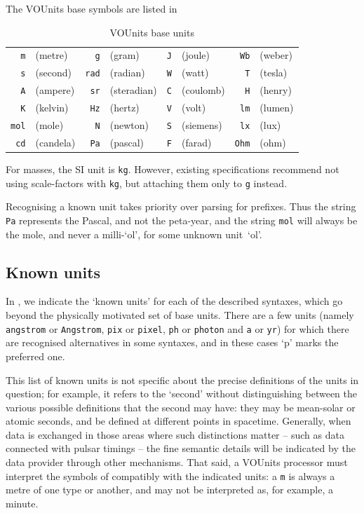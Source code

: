 \documentclass[11pt,a4paper]{ivoa}
\newcommand{\unit}[1]{\texttt{\small\color{orange}#1}}
\begin{document}
The VOUnits base symbols are listed in 

\begin{table}[ht]
\begin{center}
\def\arraystretch{1.2}
\begin{tabular}{|rl|rl|rl|rl|}\hline
\unit{m}&(metre)		&\unit{g}&(gram) 	&\unit{J}&(joule)     	&\unit{Wb}&(weber)\\
\unit{s}&(second)		&\unit{rad}&(radian)    &\unit{W}&(watt) 	&\unit{T}&(tesla)\\
\unit{A}&(ampere)		&\unit{sr}&(steradian)  &\unit{C}&(coulomb)	&\unit{H}&(henry)\\
\unit{K}&(kelvin)		&\unit{Hz}&(hertz)      &\unit{V}&(volt) 	&\unit{lm}&(lumen)\\
\unit{mol}&(mole)		&\unit{N}&(newton)      &\unit{S}&(siemens)	&\unit{lx}&(lux)\\
\unit{cd}&(candela)		&\unit{Pa}&(pascal)     &\unit{F}&(farad)	&\unit{Ohm}&(ohm)\\\hline
\end{tabular}
\end{center}
\caption{\label{tab:voubase}VOUnits base units}
\end{table}

For masses, the SI unit is \unit{kg}. However, existing specifications
recommend not using scale-factors with \unit{kg}, but attaching them
only to \unit{g} instead.

Recognising a known unit takes priority over parsing for prefixes.
Thus the string \unit{Pa} represents the Pascal, and not the
peta-year, and the string \unit{mol} will always be the mole, and
never a milli-`ol', for some unknown unit~`ol'.

\subsection{Known units}
\label{sec:knownunits}

In , we indicate the `known units' for each of the
described syntaxes, which go beyond the physically motivated set of
base units.
There are a few units (namely \unit{angstrom} or \unit{Angstrom},
\unit{pix} or \unit{pixel}, \unit{ph} or \unit{photon} and \unit{a} or \unit{yr}) for
which there are recognised alternatives in some syntaxes, and in these
cases `p' marks the preferred one.

This list of known units is not specific about the precise definitions
of the units in question; for example, it refers to the `second'
without distinguishing between the various possible definitions that
the second may have: they may be mean-solar or atomic seconds, and be
defined at different points in spacetime.  Generally, when data is
exchanged in those areas where such distinctions matter -- such as
data connected with pulsar timings -- the fine semantic details will
be indicated by the data provider through other mechanisms.  That
said, a VOUnits processor must interpret the symbols
of  compatibly with the indicated units:
a \unit{m} is always a metre of one type or another, and may not be
interpreted as, for example, a minute.
\end{document}
